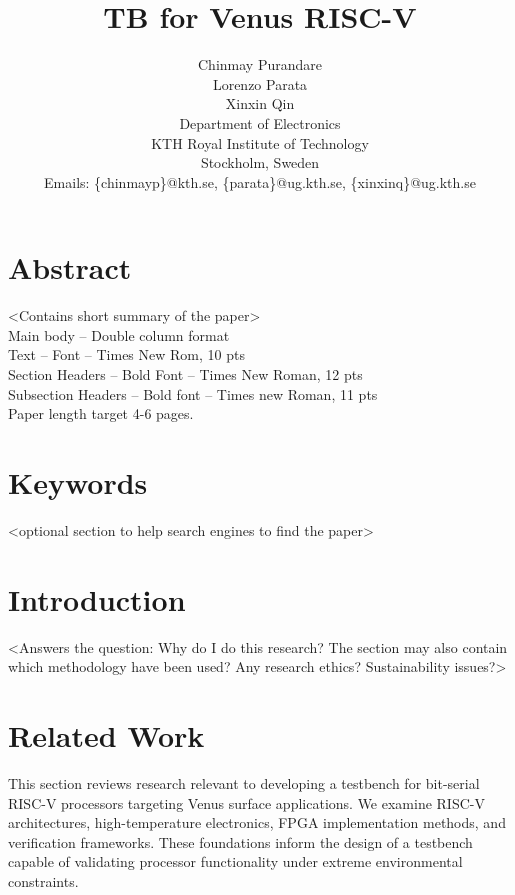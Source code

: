 \documentclass[10pt,twocolumn]{article}
\title{\textbf{TB for Venus RISC-V}\\[0.5em]}
\author{Chinmay Purandare\\
Lorenzo Parata\\
Xinxin Qin\\
Department of Electronics\\
KTH Royal Institute of Technology\\
Stockholm, Sweden\\
Emails: \{chinmayp\}@kth.se, \{parata\}@ug.kth.se, \{xinxinq\}@ug.kth.se}
\date{}
\begin{document}
\maketitle

\section*{Abstract}
<Contains short summary of the paper>\\
Main body – Double column format\\
Text – Font – Times New Rom, 10 pts\\
Section Headers – Bold Font – Times New Roman, 12 pts\\
Subsection Headers – Bold font – Times new Roman, 11 pts\\
Paper length target 4-6 pages.

\section*{Keywords}
<optional section to help search engines to find the paper>

\section{Introduction}
<Answers the question: Why do I do this research? The section may also contain which methodology have been used? Any research ethics? Sustainability issues?>

\section{Related Work}
This section reviews research relevant to developing a testbench for bit-serial RISC-V processors targeting Venus surface applications. We examine RISC-V architectures, high-temperature electronics, FPGA implementation methods, and verification frameworks. These foundations inform the design of a testbench capable of validating processor functionality under extreme environmental constraints.
\end{document}

